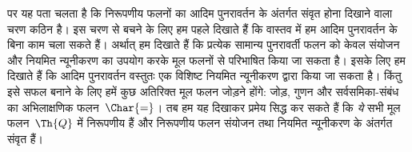 \documentclass[../../../include/open-logic-section]{subfiles}
\begin{document}
पर यह पता चलता है कि निरूपणीय फलनों का आदिम पुनरावर्तन के अंतर्गत संवृत
होना दिखाने वाला चरण कठिन है। इस चरण से बचने के लिए हम पहले दिखाते हैं कि
वास्तव में हम आदिम पुनरावर्तन के बिना काम चला सकते हैं। अर्थात् हम दिखाते
हैं कि प्रत्येक सामान्य पुनरावर्ती फलन को केवल संयोजन और नियमित न्यूनीकरण
का उपयोग करके मूल फलनों से परिभाषित किया जा सकता है। इसके लिए हम दिखाते
हैं कि आदिम पुनरावर्तन वस्तुतः एक विशिष्ट नियमित न्यूनीकरण द्वारा किया जा
सकता है। किंतु इसे सफल बनाने के लिए हमें कुछ अतिरिक्त मूल फलन जोड़ने होंगे:
जोड़, गुणन और सर्वसमिका-संबंध का अभिलाक्षणिक फलन~$\Char{=}$। तब हम यह
दिखाकर प्रमेय सिद्ध कर सकते हैं कि \emph{ये} सभी मूल फलन~$\Th{Q}$ में
निरूपणीय हैं और निरूपणीय फलन संयोजन तथा नियमित न्यूनीकरण के अंतर्गत संवृत
हैं।
\end{document}
